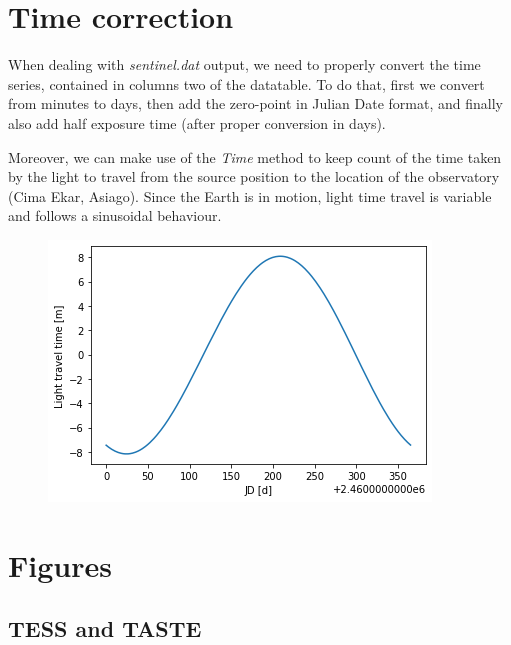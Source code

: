 \documentclass[a4paper,11pt,twocolumn]{article}
\begin{document}
\section{Time correction}
\label{sect:app_B}

When dealing with \textit{sentinel.dat} output, we need to properly convert the 
time series, contained in columns two of the datatable. To do that, first we
convert from minutes to days, then add the zero-point in Julian Date format, and 
finally also add half exposure time (after proper conversion in days).

Moreover, we can make use of the \textit{Time} method to keep count of the time 
taken by the light to travel from the source position to the location of the 
observatory (Cima Ekar, Asiago). Since the Earth is in motion, light time 
travel is variable and follows a sinusoidal behaviour.
\begin{figure}[H]
    \centering  
    \includegraphics[scale=0.7, angle=0]{../pictures/time_corr.png}
\end{figure}


\section{Figures}




\subsection{TESS and TASTE}
\label{sect:app_C_TT}
\end{document}
